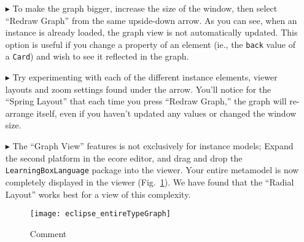 \begin{itemize}
\item[$\blacktriangleright$] To make the graph bigger, increase the size of the window, then select ``Redraw Graph'' from the same upside-down arrow. As you can
see, when an instance is already loaded, the graph view is not automatically updated. This option is useful if you change a property of an element (ie., the
\texttt{back} value of a \texttt{Card}) and wish to see it reflected in the graph.

\item[$\blacktriangleright$] Try experimenting with each of the different instance elements, viewer layouts and zoom settings found under the arrow. You'll
notice for the ``Spring Layout'' that each time you press ``Redraw Graph,'' the graph will re-arrange itself, even if you haven't updated any values or changed the window size.

\item[$\blacktriangleright$] The ``Graph View'' features is not exclusively for instance models; Expand the second platform in the ecore editor, and drag and
drop the \texttt{LearningBoxLanguage} package into the viewer. Your entire metamodel is now completely displayed in the viewer
(Fig.~\ref{fig:graphView_typeGraph}). We have found that the ``Radial Layout'' works best for a view of this complexity.

\vspace{1cm}

\begin{figure}[htbp]
	\centering
  \texttt{[image: eclipse\_entireTypeGraph]}
	\caption{Comment}
	\label{fig:graphView_typeGraph}
\end{figure}


\end{itemize}
